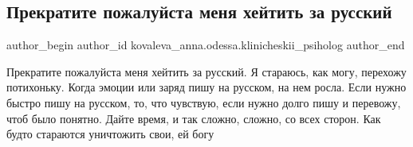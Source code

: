  
 
 
 
 

\subsection{Прекратите пожалуйста меня хейтить за русский}
\label{sec:24_11_2022.fb.kovaleva_anna.odessa.klinicheskii_psiholog.1.prekratite_pozhaluis}

\ifcmt
 author_begin
   author_id kovaleva_anna.odessa.klinicheskii_psiholog
 author_end
\fi

Прекратите пожалуйста меня хейтить за русский. Я стараюсь, как могу, перехожу
потихоньку. Когда эмоции или заряд пишу на русском, на нем росла. Если нужно
быстро пишу на русском, то, что чувствую,  если нужно долго пишу и перевожу,
чтоб было понятно. Дайте время, и так сложно, сложно,  со всех сторон. Как
будто стараются уничтожить свои, ей богу 💙
